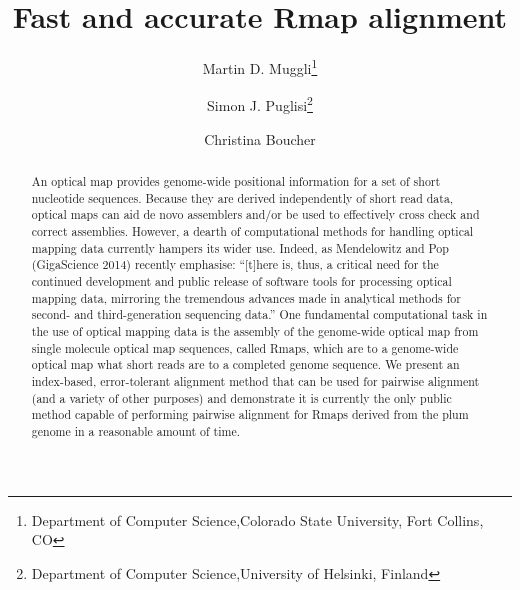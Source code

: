 \documentclass[11pt,letterpaper]{article}
\begin{document}
\title{Fast and accurate Rmap alignment}
\author{Martin D. Muggli\thanks{Department of Computer Science,Colorado State University, Fort Collins, CO}
\and Simon J. Puglisi\thanks{Department of Computer Science,University of Helsinki, Finland}
\and Christina Boucher\footnotemark[1]}%
\date{}
\maketitle

\begin{abstract}
An optical map provides genome-wide positional information
for a set of short nucleotide sequences. Because they are derived
independently of short read data, optical maps can aid de novo assemblers
and/or be used to effectively cross check and correct assemblies.
However, a dearth of computational methods for handling optical mapping
data currently hampers its wider use.
Indeed, as Mendelowitz and 
Pop (GigaScience 2014) recently emphasise:  ``[t]here is, thus, a critical need for the continued 
development and public release of software tools for processing optical mapping data, mirroring the 
tremendous advances made in analytical methods for second- and third-generation sequencing data.''  
One fundamental computational task in the use of optical mapping data is the assembly of the genome-wide 
optical map from single molecule optical map sequences, called Rmaps, which are to a genome-wide optical map what short 
reads are to a completed genome sequence. 
We present an index-based, error-tolerant 
alignment method that can be used for pairwise alignment (and a variety of other purposes) and demonstrate it is currently the only public method capable of performing pairwise 
alignment for Rmaps derived from the plum genome in a reasonable amount of time.
\end{abstract}

\end{document}
